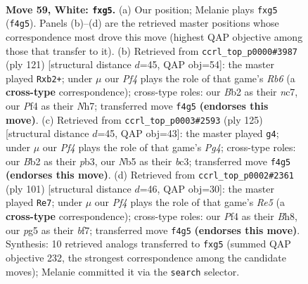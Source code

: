 \documentclass[11pt]{article}
\begin{document}
\clearpage

\begin{figure}[p]\centering
\begin{subfigure}{0.46\textwidth}\centering
\resizebox{\linewidth}{!}{%
\newchessgame
\chessboard[
  setfen={6k1/4p3/npr4p/pN4p1/P1p2P2/2P3K1/1B1R4/8 w - - 1 59},
  showmover=false,
  pgfstyle=straightmove, color=movearrow, markmove={f4-g5}
]}
\caption{}
\end{subfigure}\hfill
\begin{subfigure}{0.46\textwidth}\centering
\resizebox{\linewidth}{!}{%
\newchessgame
\chessboard[
  setfen={6k1/2N4n/1p3pp1/p2P2P1/5P1P/1r6/1P3K2/2R5 b - - 0 61},
  showmover=false,
  pgfstyle=straightmove, color=movearrow, markmove={b3-b2}
]}
\caption{}
\end{subfigure}
\\[4pt]
\begin{subfigure}{0.46\textwidth}\centering
\resizebox{\linewidth}{!}{%
\newchessgame
\chessboard[
  setfen={4r3/1p6/p5k1/P1KP1npp/5P2/1PB2R1P/8/8 b - - 2 63},
  showmover=false,
  pgfstyle=straightmove, color=movearrow, markmove={g5-g4}
]}
\caption{}
\end{subfigure}\hfill
\begin{subfigure}{0.46\textwidth}\centering
\resizebox{\linewidth}{!}{%
\newchessgame
\chessboard[
  setfen={7b/5B2/1p1k2p1/6p1/P2PrpP1/1P1R3P/3K4/8 b - - 10 51},
  showmover=false,
  pgfstyle=straightmove, color=movearrow, markmove={e4-e7}
]}
\caption{}
\end{subfigure}
\caption{\textbf{Move 59, White: \texttt{fxg5}.} (a) Our position; Melanie plays \texttt{fxg5} (\texttt{f4g5}). Panels (b)--(d) are the retrieved master positions whose correspondence most drove this move (highest QAP objective among those that transfer to it). (b) Retrieved from \texttt{ccrl\_top\_p0000\#3987} (ply 121) [structural distance $d$=45, QAP obj=54]: the master played \texttt{Rxb2+}; under $\mu$ our \emph{Pf4} plays the role of that game's \emph{Rb6} (a \textbf{cross-type} correspondence); cross-type roles: our \emph{B}b2 as their \emph{n}c7, our \emph{P}f4 as their \emph{N}h7; transferred move \texttt{f4g5} \textbf{(endorses this move)}. (c) Retrieved from \texttt{ccrl\_top\_p0003\#2593} (ply 125) [structural distance $d$=45, QAP obj=43]: the master played \texttt{g4}; under $\mu$ our \emph{Pf4} plays the role of that game's \emph{Pg4}; cross-type roles: our \emph{B}b2 as their \emph{p}b3, our \emph{N}b5 as their \emph{b}c3; transferred move \texttt{f4g5} \textbf{(endorses this move)}. (d) Retrieved from \texttt{ccrl\_top\_p0002\#2361} (ply 101) [structural distance $d$=46, QAP obj=30]: the master played \texttt{Re7}; under $\mu$ our \emph{Pf4} plays the role of that game's \emph{Re5} (a \textbf{cross-type} correspondence); cross-type roles: our \emph{P}f4 as their \emph{B}h8, our \emph{p}g5 as their \emph{b}f7; transferred move \texttt{f4g5} \textbf{(endorses this move)}. Synthesis: 10 retrieved analogs transferred to \texttt{fxg5} (summed QAP objective 232, the strongest correspondence among the candidate moves); Melanie committed it via the \texttt{search} selector.}
\label{fig:thought-m116}
\end{figure}
\end{document}
